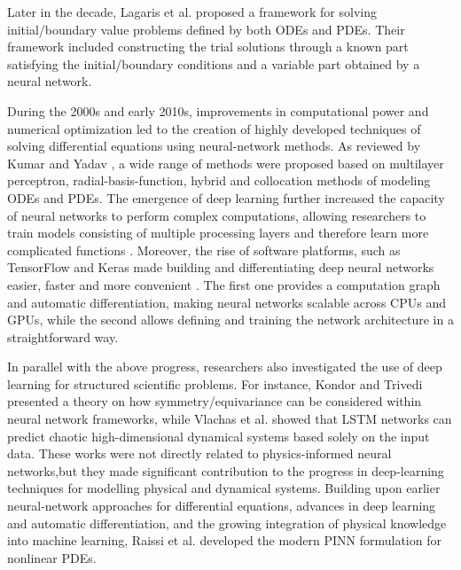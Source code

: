 \documentclass[11pt]{article}
\begin{document}
Later in the decade, Lagaris et al. \cite{lagarisArtificialNeuralNetworks1998} proposed a framework for solving initial/boundary value problems defined by both ODEs and PDEs. Their framework included constructing the trial solutions through a known part satisfying the initial/boundary conditions and a variable part obtained by a neural network.

During the 2000s and early 2010s, improvements in computational power and numerical optimization led to the creation of highly developed techniques of solving differential equations using neural-network methods. As reviewed by Kumar and Yadav \cite{kumarMultilayerPerceptronsRadial2011} , a wide range of methods were proposed based on multilayer perceptron, radial-basis-function, hybrid and collocation methods of modeling ODEs and PDEs. The emergence of deep learning further increased the capacity of neural networks to perform complex computations, allowing researchers to train models consisting of multiple processing layers and therefore learn more complicated functions \cite{lecunDeepLearning2015}. Moreover, the rise of software platforms, such as TensorFlow and Keras made building and differentiating deep neural networks easier, faster and more convenient \cite{abadi2016tensorflow, ketkar2017introduction}. The first one provides a computation graph and automatic differentiation, making neural networks scalable across CPUs and GPUs, while the second allows defining and training the network architecture in a straightforward way.

In parallel with the above progress, researchers also investigated the use of deep learning for structured scientific problems. For instance, Kondor and Trivedi \cite{kondorGeneralizationEquivarianceConvolution} presented a theory on how symmetry/equivariance can be considered within neural network frameworks, while Vlachas et al. \cite{vlachasDatadrivenForecastingHighdimensional2018} showed that LSTM networks can predict chaotic high-dimensional dynamical systems based solely on the input data. These works were not directly related to physics-informed neural networks,but they made significant contribution to the progress in deep-learning techniques for modelling physical and dynamical systems. Building upon earlier neural-network approaches for differential equations, advances in deep learning and automatic differentiation, and the growing integration of physical knowledge into machine learning, Raissi et al. \cite{raissiPhysicsinformedNeuralNetworks2019} developed the modern PINN formulation for nonlinear PDEs.
\end{document}
